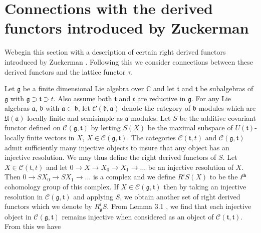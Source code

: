
\chapter[Connections with the derived functors...]{Connections with
  the derived functors introduced by 
  Zuckerman}\label{sec16}

We\pageoriginale begin this section with a description of certain
right derived functors introduced by Zuckerman \cite{key40}. Following
this we consider connections between these derived functors and the
lattice functor $\tau$. 

Let $\mathfrak{g}$ be a finite dimensional Lie algebra over
$\mathbb{C}$ and let $\mathfrak{t}$ and $\mathfrak{t}$ be subalgebras
of $\mathfrak{g}$ with $\mathfrak{g} \supset \mathfrak{t} \supset
t$. Also assume both $\mathfrak{t}$ and $t$ are reductive in
$\mathfrak{g}$. For any Lie algebras $\mathfrak{a}$, $\mathfrak{b}$
with $\mathfrak{a} \subset \mathfrak{b}$, let $\mathcal{C}
(\mathfrak{b}, \mathfrak{a})$ denote the category of
$\mathfrak{b}$-modules which are $\mathfrak{U}(\mathfrak{a})$-locally
finite and semisimple as $\mathfrak{a}$-modules. Let $S$ be the
additive covariant functor defined on  $\mathcal{C} (\mathfrak{g},
\mathfrak{t})$ by letting $S(X)$ be the maximal subspace of
$U(\mathfrak{t})$-locally finite vectors in $X$, $X \in \mathcal{C}
(\mathfrak{g}, \mathfrak{t})$. The categories
$\mathcal{C}(\mathfrak{t},t)$ and $\mathcal{C}(\mathfrak{g},
\mathfrak{t})$ admit sufficiently many injective objects to insure
that any object has an injective resolution. We may thus define the
right derived functors of $S$. Let $X \in \mathcal{C}(\mathfrak{t},
t)$ and let $0 \to X \to X_0 \to X_1 \to \ldots$ be an injective
resolution of $X$. Then $0 \to SX_0 \to SX_1 \to \ldots$ is a complex
and we define $R^iS(X)$ to be the $i^{\rm th} $ cohomology group of
this complex. If $X \in \mathcal{C} (\mathfrak{g}, \mathfrak{t})$ then
by taking an injective resolution in $\mathcal{C}(\mathfrak{g},
\mathfrak{t})$ and applying $S$, we obtain another set of right
derived functors which we denote by $R^i_\mathfrak{g}S$. From Lemma
3.1 \cite{key19}, we find that each injective object in $\mathcal{C}
(\mathfrak{g}, \mathfrak{t})$ remains injective when considered as an
object of $\mathcal{C}(\mathfrak{t}, \mathfrak{t})$. From this we have 

